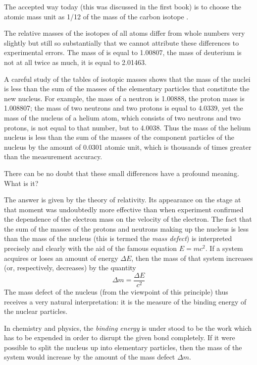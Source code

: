 The accepted way today (this was discussed in the first book) is to choose the atomic mass unit as 1/12 of the mass of the carbon isotope .

The relative masses of the isotopes of all atoms differ from whole numbers very slightly but still so substan­tially that we cannot attribute these differences to exper­imental errors. The mass of is equal to 1.00807, the mass of deuterium is not at all twice as much, it is equal to 2.01463.

A careful study of the tables of isotopic masses shows that the mass of the nuclei is less than the sum of the masses of the elementary particles that constitute the new nucleus. For example, the mass of a neutron is 1.00888, the proton mass is 1.008807; the mass of two neutrons and two protons is equal to 4.0339, yet the mass of the nucleus of a helium atom, which consists of two neutrons and two protons, is not equal to that number, but to 4.0038. Thus the mass of the helium nucleus is less than the sum of the masses of the component parti­cles of the nucleus by the amount of 0.0301 atomic unit, which is thousands of times greater than the measurement accuracy.

There can be no doubt that these small differences have a profound meaning. What is it?

The answer is given by the theory of relativity. Its appearance on the stage at that moment was undoubtedly more effective than when experiment confirmed the de­pendence of the electron mass on the velocity of the elec­tron. The fact that the sum of the masses of the protons and neutrons making up the nucleus is less than the mass of the nucleus (this is termed the \emph{mass defect}) is interpreted precisely and clearly with the aid of the famous equation $E =mc^{2}$. If a system acquires or loses an amount of energy $\Delta E$, then the mass of that system increases (or, respectively, decreases) by the quantity
\begin{equation*}%
\Delta m = \frac{\Delta E}{c^{2}}
\end{equation*}
The mass defect of the nucleus (from the viewpoint of this principle) thus receives a very natural interpreta­tion: it is the measure of the binding energy of the nuclear particles.

In chemistry and physics, the \emph{binding energy} is under­ stood to be the work which has to be expended in order to disrupt the given bond completely. If it were possible to split the nucleus up into elementary particles, then the mass of the system would increase by the amount of the mass defect $\Delta m$.


